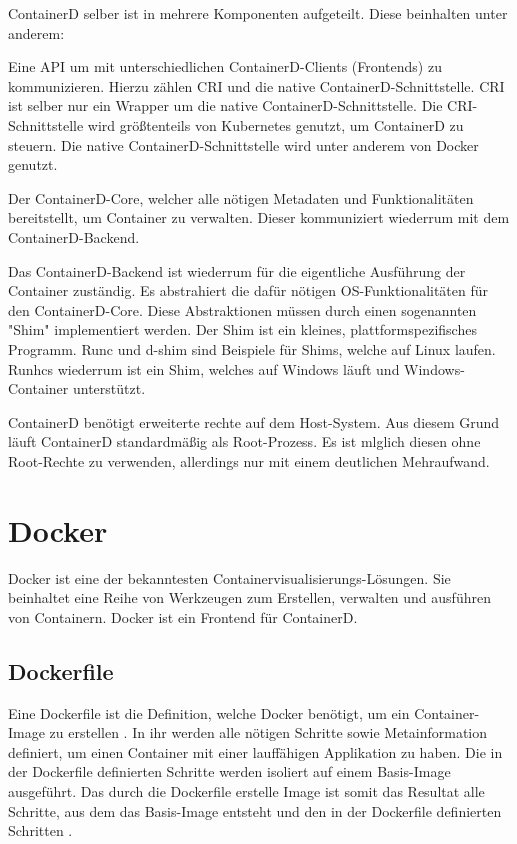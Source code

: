\begin{figure}[H]
\end{figure}


ContainerD selber ist in mehrere Komponenten aufgeteilt. Diese beinhalten unter anderem:

Eine API um mit unterschiedlichen ContainerD-Clients (Frontends) zu kommunizieren. Hierzu zählen CRI und die native ContainerD-Schnittstelle. CRI ist selber nur ein Wrapper um die native ContainerD-Schnittstelle. Die CRI-Schnittstelle wird größtenteils von Kubernetes genutzt, um ContainerD zu steuern. Die native ContainerD-Schnittstelle wird unter anderem von Docker genutzt.

Der ContainerD-Core, welcher alle nötigen Metadaten und Funktionalitäten bereitstellt, um Container zu verwalten. Dieser kommuniziert wiederrum mit dem ContainerD-Backend.

Das ContainerD-Backend ist wiederrum für die eigentliche Ausführung der Container zuständig. Es abstrahiert die dafür nötigen OS-Funktionalitäten für den ContainerD-Core. Diese Abstraktionen müssen durch einen sogenannten "Shim" implementiert werden. Der Shim ist ein kleines, plattformspezifisches Programm. Runc und d-shim sind Beispiele für Shims, welche auf Linux laufen. Runhcs wiederrum ist ein Shim, welches auf Windows läuft und Windows-Container unterstützt.  

ContainerD benötigt erweiterte rechte auf dem Host-System. Aus diesem Grund läuft ContainerD standardmäßig als Root-Prozess. Es ist mlglich diesen ohne Root-Rechte zu verwenden, allerdings nur mit einem deutlichen Mehraufwand.

\section{Docker}

Docker ist eine der bekanntesten Containervisualisierungs-Lösungen. Sie beinhaltet eine Reihe von Werkzeugen zum Erstellen, verwalten und ausführen von Containern. Docker ist ein Frontend für ContainerD.

\subsection{Dockerfile}

Eine Dockerfile ist die Definition, welche Docker benötigt, um ein Container-Image zu erstellen . In ihr werden alle nötigen Schritte sowie Metainformation definiert, um einen Container mit einer lauffähigen Applikation zu haben. Die in der Dockerfile definierten Schritte werden isoliert auf einem Basis-Image ausgeführt. Das durch die Dockerfile erstelle Image ist somit das Resultat alle Schritte, aus dem das Basis-Image entsteht und den in der Dockerfile definierten Schritten \cite{dockerDockerfileOverview}.

